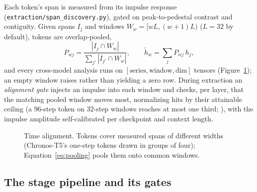 Each token's span is measured from its impulse response (\texttt{extraction/span\_discovery.py}), gated on
peak-to-pedestal contrast and contiguity. Given spans $I_j$ and windows $W_w=[wL,(w+1)L)$ ($L=32$ by
default), tokens are overlap-pooled,
\begin{equation}
  P_{wj} = \frac{|I_j \cap W_w|}{\sum_{j'} |I_{j'} \cap W_w|}, \qquad \tilde h_w = \sum_j P_{wj}\, h_j ,
  \label{eq:pooling}
\end{equation}
and every cross-model analysis runs on $[\text{series},\text{window},\text{dim}]$ tensors
(Figure~\ref{fig:alignment}); an empty window raises rather than yielding a zero row. During extraction an
\emph{alignment gate} injects an impulse into each window and checks, per layer, that the matching pooled
window moves most, normalizing hits by their attainable ceiling (a 96-step token on 32-step windows reaches
at most one third; ), with the impulse amplitude self-calibrated per checkpoint and context
length.

\begin{figure}[tb]
\centering
{}
\caption{Time alignment. Tokens cover measured spans of different widths (Chronos-T5's one-step tokens drawn
in groups of four); Equation~\eqref{eq:pooling} pools them onto common windows.}
\label{fig:alignment}
\end{figure}

\subsection{The stage pipeline and its gates}
\label{sec:stages}

